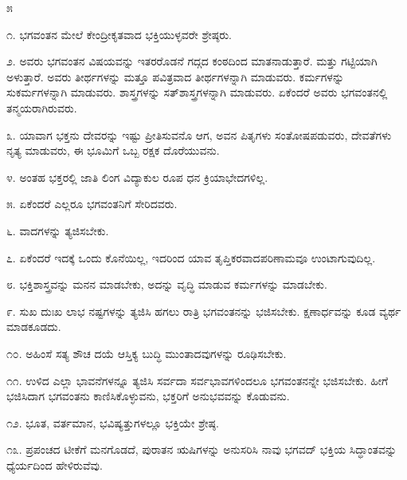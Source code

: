 \begin{center}
೫
\end{center}

೧. ಭಗವಂತನ ಮೇಲೆ ಕೇಂದ್ರೀಕೃತವಾದ ಭಕ್ತಿಯುಳ್ಳವರೇ ಶ್ರೇಷ್ಠರು.

೨. ಅವರು ಭಗವಂತನ ವಿಷಯವನ್ನು ಇತರರೊಡನೆ ಗದ್ಗದ ಕಂಠದಿಂದ ಮಾತನಾಡುತ್ತಾರೆ. ಮತ್ತು ಗಟ್ಟಿಯಾಗಿ ಅಳುತ್ತಾರೆ. ಅವರು ತೀರ್ಥಗಳನ್ನು ಮತ್ತೂ ಪವಿತ್ರವಾದ ತೀರ್ಥಗಳನ್ನಾಗಿ ಮಾಡುವರು. ಕರ್ಮಗಳನ್ನು ಸುಕರ್ಮಗಳನ್ನಾಗಿ ಮಾಡುವರು. ಶಾಸ್ತ್ರಗಳನ್ನು ಸತ್​ಶಾಸ್ತ್ರಗಳನ್ನಾಗಿ ಮಾಡುವರು. ಏಕೆಂದರೆ ಅವರು ಭಗವಂತನಲ್ಲಿ ತನ್ಮಯರಾಗಿರುವರು.

೩. ಯಾವಾಗ ಭಕ್ತನು ದೇವರನ್ನು ಇಷ್ಟು ಪ್ರೀತಿಸುವನೊ ಆಗ, ಅವನ ಪಿತೃಗಳು ಸಂತೋಷಪಡುವರು, ದೇವತೆಗಳು ನೃತ್ಯ ಮಾಡುವರು, ಈ ಭೂಮಿಗೆ ಒಬ್ಬ ರಕ್ಷಕ ದೊರೆಯುವನು.

೪. ಅಂತಹ ಭಕ್ತರಲ್ಲಿ ಜಾತಿ ಲಿಂಗ ವಿದ್ಯಾಕುಲ ರೂಪ ಧನ ಕ್ರಿಯಾಭೇದಗಳಿಲ್ಲ.

೫. ಏಕೆಂದರೆ ಎಲ್ಲರೂ ಭಗವಂತನಿಗೆ ಸೇರಿದವರು.

೬. ವಾದಗಳನ್ನು ತ್ಯಜಿಸಬೇಕು.

೭. ಏಕೆಂದರೆ ಇದಕ್ಕೆ ಒಂದು ಕೊನೆಯಿಲ್ಲ, ಇದರಿಂದ ಯಾವ ತೃಪ್ತಿಕರವಾದ\break ಪರಿಣಾಮವೂ ಉಂಟಾಗುವುದಿಲ್ಲ.

೮. ಭಕ್ತಿಶಾಸ್ತ್ರವನ್ನು ಮನನ ಮಾಡಬೇಕು, ಅದನ್ನು ವೃದ್ಧಿ ಮಾಡುವ ಕರ್ಮಗಳನ್ನು ಮಾಡಬೇಕು.

೯. ಸುಖ ದುಃಖ ಲಾಭ ನಷ್ಟಗಳನ್ನು ತ್ಯಜಿಸಿ ಹಗಲು ರಾತ್ರಿ ಭಗವಂತನನ್ನು ಭಜಿಸಬೇಕು. ಕ್ಷಣಾರ್ಧವನ್ನು ಕೂಡ ವ್ಯರ್ಥ ಮಾಡಕೂಡದು.

೧೦. ಅಹಿಂಸೆ ಸತ್ಯ ಶೌಚ ದಯೆ ಆಸ್ತಿಕ್ಯ ಬುದ್ಧಿ ಮುಂತಾದವುಗಳನ್ನು ರೂಢಿಸಬೇಕು.

೧೧. ಉಳಿದ ಎಲ್ಲಾ ಭಾವನೆಗಳನ್ನೂ ತ್ಯಜಿಸಿ ಸರ್ವದಾ ಸರ್ವಭಾವಗಳಿಂದಲೂ ಭಗವಂತನನ್ನೇ ಭಜಿಸಬೇಕು. ಹೀಗೆ ಭಜಿಸಿದಾಗ ಭಗವಂತನು ಕಾಣಿಸಿಕೊಳ್ಳುವನು, ಭಕ್ತರಿಗೆ ಅನುಭವವನ್ನು ಕೊಡುವನು.

೧೨. ಭೂತ, ವರ್ತಮಾನ, ಭವಿಷ್ಯತ್ತುಗಳಲ್ಲೂ ಭಕ್ತಿಯೇ ಶ್ರೇಷ್ಠ.

೧೩. ಪ್ರಪಂಚದ ಟೀಕೆಗೆ ಮನಗೊಡದೆ, ಪುರಾತನ ಋಷಿಗಳನ್ನು ಅನುಸರಿಸಿ ನಾವು ಭಗವದ್​ ಭಕ್ತಿಯ ಸಿದ್ಧಾಂತವನ್ನು ಧ್ಯೆರ್ಯದಿಂದ ಹೇಳಿರುವೆವು.

\eject

